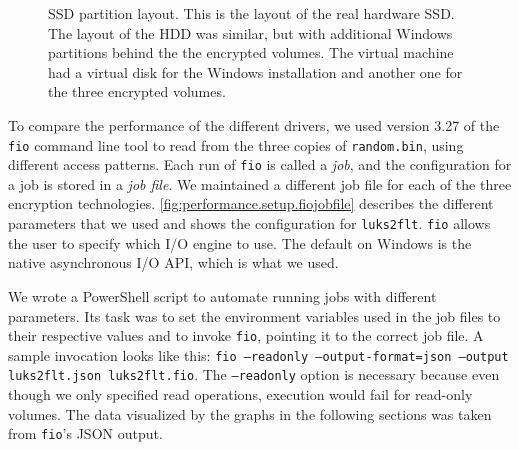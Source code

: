 \begin{figure}[htb!]
	\caption[
		SSD partition layout
	]{
		SSD partition layout. This is the layout of the real hardware SSD. The layout of the HDD was similar, but with additional Windows partitions behind the the encrypted volumes. The virtual machine had a virtual disk for the Windows installation and another one for the three encrypted volumes.
	}
	\label{fig:performance.setup.disklayout}
\end{figure}

To compare the performance of the different drivers, we used version 3.27 of the \texttt{fio} command line tool \cite{Fio} to read from the three copies of \texttt{random.bin}, using different access patterns. Each run of \texttt{fio} is called a \emph{job}, and the configuration for a job is stored in a \emph{job file}. We maintained a different job file for each of the three encryption technologies. \autoref{fig:performance.setup.fiojobfile} describes the different parameters that we used and shows the configuration for \texttt{luks2flt}. \texttt{fio} allows the user to specify which I/O engine to use. The default on Windows is the native asynchronous I/O API, which is what we used.

We wrote a PowerShell script to automate running jobs with different parameters. Its task was to set the environment variables used in the job files to their respective values and to invoke \texttt{fio}, pointing it to the correct job file. A sample invocation looks like this: \texttt{fio ---readonly ---output-format=json ---output luks2flt.json luks2flt.fio}. The \texttt{---readonly} option is necessary because even though we only specified read operations, execution would fail for read-only volumes. The data visualized by the graphs in the following sections was taken from \texttt{fio}'s JSON output.

